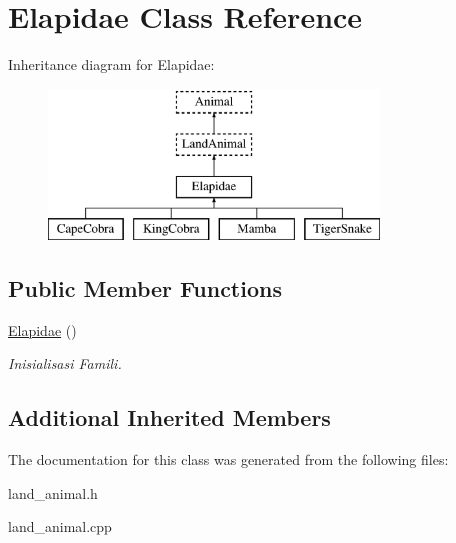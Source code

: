 \hypertarget{class_elapidae}{}\section{Elapidae Class Reference}
\label{class_elapidae}
Inheritance diagram for Elapidae\+:\begin{figure}[H]
\begin{center}
\leavevmode
\includegraphics[height=4.000000cm]{class_elapidae}
\end{center}
\end{figure}
\subsection*{Public Member Functions}
\begin{DoxyCompactItemize}
\item 
\hyperlink{class_elapidae_ae3863a25a7118386f2a439c834501041}{Elapidae} ()\hypertarget{class_elapidae_ae3863a25a7118386f2a439c834501041}{}\label{class_elapidae_ae3863a25a7118386f2a439c834501041}

\begin{DoxyCompactList}\small\item\em Inisialisasi Famili. \end{DoxyCompactList}\end{DoxyCompactItemize}
\subsection*{Additional Inherited Members}


The documentation for this class was generated from the following files\+:\begin{DoxyCompactItemize}
\item 
land\+\_\+animal.\+h\item 
land\+\_\+animal.\+cpp\end{DoxyCompactItemize}
